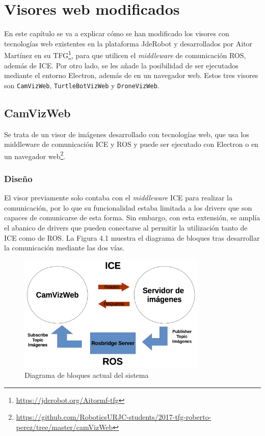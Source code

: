 \chapter{Visores web modificados}\label{cap.Visores}
En este capítulo se va a explicar cómo se han modificado los visores con tecnologías web existentes en la plataforma JdeRobot y desarrollados por Aitor Martínez en su TFG\footnote{\url{https://jderobot.org/Aitormf-tfg}}, para que utilicen el \textit{middleware} de comunicación ROS, además de ICE. Por otro lado, se les añade la posibilidad de ser ejecutados mediante el entorno Electron, además de en un navegador web. Estos tres visores son \texttt{CamVizWeb}, \texttt{TurtleBotVizWeb} y \texttt{DroneVizWeb}.

\section{CamVizWeb}
Se trata de un visor de imágenes desarrollado con tecnologías web, que usa los middleware de comunicación ICE y ROS  y puede ser ejecutado con Electron o en un navegador web\footnote{\url{https://github.com/RoboticsURJC-students/2017-tfg-roberto-perez/tree/master/camVizWeb}}.

\subsection{Diseño}
El visor previamente solo contaba con el \textit{middleware} ICE para realizar la comunicación, por lo que su funcionalidad estaba limitada a los drivers que son capaces de comunicarse de esta forma. Sin embargo, con esta extensión, se amplía el abanico de drivers que pueden conectarse al permitir la utilización tanto de ICE como de ROS. La Figura 4.1 muestra el diagrama de bloques tras desarrollar la comunicación mediante las dos vías.

\begin{figure}[H]
  \begin{center}
    \includegraphics[width=0.8\textwidth]{figures/esquemacamviz2.png}
		\caption{Diagrama de bloques actual del sistema}
		\label{fig.esquemacamviz2}
		\end{center}
\end{figure}

